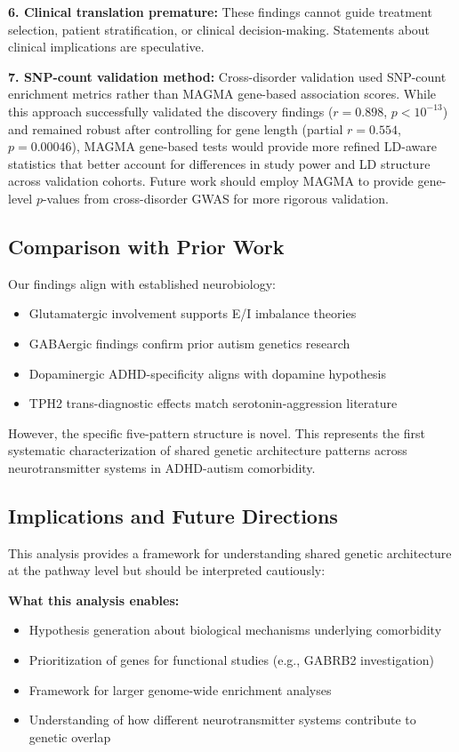 \documentclass[12pt,letterpaper]{article}
\theoremstyle{definition}
\theoremstyle{remark}
\begin{document}
\textbf{6. Clinical translation premature:} These findings cannot guide treatment selection, patient stratification, or clinical decision-making. Statements about clinical implications are speculative.

\textbf{7. SNP-count validation method:} Cross-disorder validation used SNP-count enrichment metrics rather than MAGMA gene-based association scores. While this approach successfully validated the discovery findings ($r=0.898$, $p<10^{-13}$) and remained robust after controlling for gene length (partial $r=0.554$, $p=0.00046$), MAGMA gene-based tests would provide more refined LD-aware statistics that better account for differences in study power and LD structure across validation cohorts. Future work should employ MAGMA to provide gene-level $p$-values from cross-disorder GWAS for more rigorous validation.

\subsection{Comparison with Prior Work}

Our findings align with established neurobiology:
\begin{itemize}
    \item Glutamatergic involvement supports E/I imbalance theories\cite{rubenstein2003,nelson2015}
    \item GABAergic findings confirm prior autism genetics research\cite{cook1998,hogart2007}
    \item Dopaminergic ADHD-specificity aligns with dopamine hypothesis\cite{volkow2009,faraone2019}
    \item TPH2 trans-diagnostic effects match serotonin-aggression literature\cite{zhang2024,veenstra2012}
\end{itemize}

However, the specific five-pattern structure is novel. This represents the first systematic characterization of shared genetic architecture patterns across neurotransmitter systems in ADHD-autism comorbidity.

\subsection{Implications and Future Directions}

This analysis provides a framework for understanding shared genetic architecture at the pathway level but should be interpreted cautiously:

\textbf{What this analysis enables:}
\begin{itemize}
    \item Hypothesis generation about biological mechanisms underlying comorbidity
    \item Prioritization of genes for functional studies (e.g., GABRB2 investigation)
    \item Framework for larger genome-wide enrichment analyses
    \item Understanding of how different neurotransmitter systems contribute to genetic overlap
\end{itemize}
\end{document}

